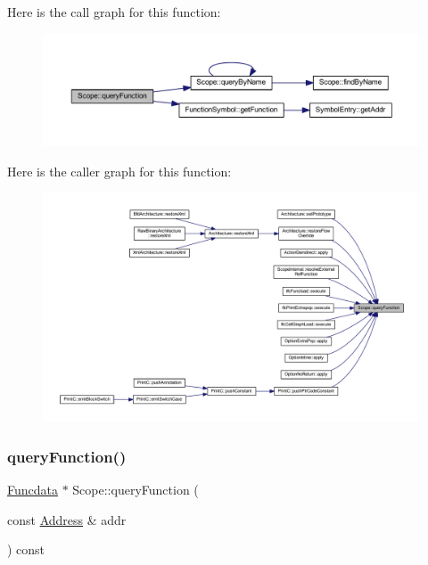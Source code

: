 Here is the call graph for this function\+:
\nopagebreak
\begin{figure}[H]
\begin{center}
\leavevmode
\includegraphics[width=350pt]{class_scope_a6f9b49c7da91626fcb1cfacda5236991_cgraph}
\end{center}
\end{figure}
Here is the caller graph for this function\+:
\nopagebreak
\begin{figure}[H]
\begin{center}
\leavevmode
\includegraphics[width=350pt]{class_scope_a6f9b49c7da91626fcb1cfacda5236991_icgraph}
\end{center}
\end{figure}
\mbox{\label{class_scope_a5d6c56240bdb6df2d2670077cf5e08ca}} 
\subsubsection{\texorpdfstring{queryFunction()}{queryFunction()}\hspace{0.1cm}{\footnotesize\ttfamily [2/2]}}
{\footnotesize\ttfamily \mbox{\hyperlink{class_funcdata}{Funcdata}} $\ast$ Scope\+::query\+Function (\begin{DoxyParamCaption}\item[{const \mbox{\hyperlink{class_address}{Address}} \&}]{addr }\end{DoxyParamCaption}) const}



